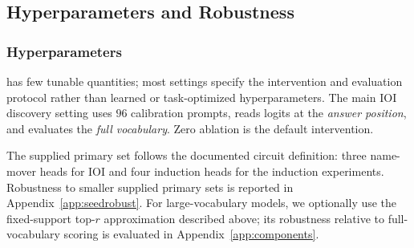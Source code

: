 \subsection{Hyperparameters and Robustness}
\label{app:hyperparams}

\subsubsection{Hyperparameters}

\coax has few tunable quantities; most settings specify the intervention and evaluation protocol rather than learned or task-optimized hyperparameters.
The main IOI discovery setting uses $96$ calibration prompts, reads logits at the \emph{answer position}, and evaluates the \emph{full vocabulary}.
Zero ablation is the default intervention.

The supplied primary set follows the documented circuit definition: three name-mover heads for IOI and four induction heads for the induction experiments.
Robustness to smaller supplied primary sets is reported in Appendix~\ref{app:seedrobust}.
For large-vocabulary models, we optionally use the fixed-support top-$r$ approximation described above; its robustness relative to full-vocabulary scoring is evaluated in Appendix~\ref{app:components}.

